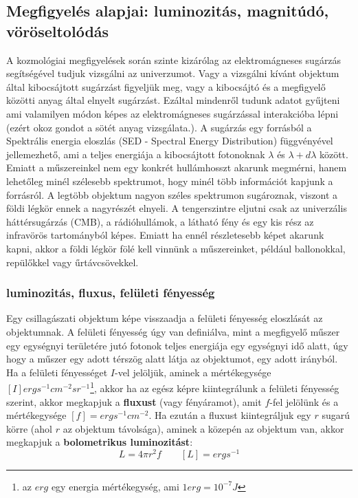 \documentclass[../main.tex]{subfiles}
\begin{document}
\subsection{Megfigyelés alapjai: luminozitás, magnitúdó, vöröseltolódás \cite{galaxy_formation}}
A kozmológiai megfigyelések során szinte kizárólag az elektromágneses sugárzás segítségével tudjuk vizsgálni az univerzumot. Vagy a vizsgálni kívánt objektum által kibocsájtott sugárzást figyeljük meg,
vagy a kibocsájtó és a megfigyelő közötti anyag által elnyelt sugárzást. Ezáltal mindenről tudunk adatot gyűjteni ami valamilyen módon képes az elektromágneses sugárzással interakcióba lépni (ezért okoz gondot
a sötét anyag vizsgálata.). A sugárzás egy forrásból a Spektrális energia eloszlás (SED - Spectral Energy Distribution) függvényével jellemezhető, ami a teljes energiája a kibocsájtott fotonoknak $\lambda$ és
$\lambda + d\lambda$ között. Emiatt a műszereinkel nem egy konkrét hullámhosszt akarunk megmérni, hanem lehetőleg minél szélesebb spektrumot, hogy minél több információt kapjunk a forrásról.
A legtöbb objektum nagyon széles spektrumon sugároznak, viszont a földi légkör ennek a nagyrészét elnyeli. A tengerszintre eljutni csak az univerzális háttérsugárzás (CMB), a rádióhullámok, a látható fény és egy kis rész az infravörös tartományból képes.
Emiatt ha ennél részletesebb képet akarunk kapni, akkor a földi légkör fölé kell vinnünk a műszereinket, például ballonokkal, repülőkkel vagy űrtávcsövekkel.

\subsubsection{luminozitás, fluxus, felületi fényesség}
Egy csillagászati objektum képe visszaadja a felületi fényesség eloszlását az objektumnak. A felületi fényesség úgy van definiálva, mint a megfigyelő műszer egy egységnyi területére jutó fotonok teljes energiája egy egységnyi idő alatt,
úgy hogy a műszer egy adott térszög alatt látja az objektumot, egy adott irányból. Ha a felületi fényességet $I$-vel jelöljük, aminek a mértékegysége $[I] erg s^{-1} cm^{-2} sr^{-1}$\footnote{
    az $erg$ egy energia mértékegység, ami $1 erg = 10^{-7} J$
}, akkor ha az egész képre kiintegrálunk a felületi fényesség szerint,
akkor megkapjuk a \textbf{fluxust} (vagy fényáramot), amit $f$-fel jelölünk és a mértékegysége $[f] = erg s^{-1} cm^{-2}$. Ha ezután a fluxust kiintegráljuk egy $r$ sugarú körre (ahol $r$ az objektum távolsága), aminek a közepén az objektum van, 
akkor megkapjuk a \textbf{bolometrikus luminozitást}:
\begin{equation}
    L = 4 \pi r^2 f \qquad [L] = erg s^{-1}
\end{equation}
\end{document}
